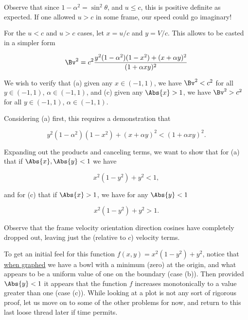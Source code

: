 {Observe that since \(1 - \alpha^2 = \sin^2\theta\), and \(u \le c\), this is positive definite as expected.  If one allowed \(u > c\) in some frame, our speed could go imaginary!

For the \(u < c\) and \(u > c\) cases, let \(x = u/c\) and \(y = V/c\).  This allows  to be casted in a simpler form

\begin{equation}\label{eqn:relativisticElectrodynamicsA1:270e}
\Bv^2 = c^2 \frac{y^2 (1 - \alpha^2)(1 - x^2) + (x + \alpha y)^2}{ (1 + \alpha x y)^2 }
\end{equation}

We wish to verify that (a) given any \(x \in (-1,1)\), we have \(\Bv^2 < c^2\) for all \(y \in (-1,1)\), \(\alpha \in (-1,1)\), and (c) given any \(\Abs{x} > 1\), we have \(\Bv^2 > c^2\) for all \(y \in (-1,1)\), \(\alpha \in (-1,1)\).

Considering (a) first, this requires a demonstration that 

\begin{equation}\label{eqn:relativisticElectrodynamicsA1:280}
y^2 (1 - \alpha^2)(1 - x^2) + (x + \alpha y)^2 < (1 + \alpha x y)^2 .
\end{equation}

Expanding out the products and canceling terms, we want to show that for (a) that if \(\Abs{x},\Abs{y} < 1\) we have

\begin{equation}\label{eqn:relativisticElectrodynamicsA1:290a}
x^2 (1 - y^2) + y^2 < 1,
\end{equation}

and for (c) that if \(\Abs{x} > 1\), we have for any \(\Abs{y} < 1\)

\begin{equation}\label{eqn:relativisticElectrodynamicsA1:290c}
x^2 (1 - y^2) + y^2 > 1.
\end{equation}

Observe that the frame velocity orientation direction cosines have completely dropped out, leaving just the (relative to \(c\)) velocity terms.

To get an initial feel for this function \(f(x,y) = x^2 (1 - y^2) + y^2\), notice that \href{http://goo.gl/5AnNF}{when graphed} we have a bowl with a minimum (zero) at the origin, and what appears to be a uniform value of one on the boundary (case (b)).  Then provided \(\Abs{y} < 1\) it appears that the function \(f\) increases monotonically to a value greater than one (case (c)).  While looking at a plot is not any sort of rigorous proof, let us move on to some of the other problems for now, and return to this last loose thread later if time permits.


} %



